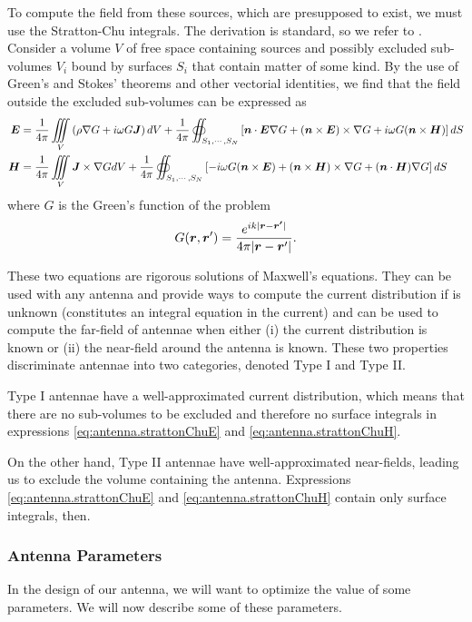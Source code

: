 To compute the field from these sources, which are presupposed to exist, 
we must use the Stratton-Chu integrals. The derivation is standard, so we 
refer to \cite{ELL2003}. Consider a volume $V$ of free space containing
sources and possibly excluded sub-volumes $V_i$ bound by surfaces $S_i$ that contain matter
of some kind. By the use of Green's and Stokes' theorems and other vectorial 
identities, we find that the field outside the excluded sub-volumes
can be expressed as
  \begin{align}
   \boldsymbol{E} &= \frac{1}{4\pi}\mathop{\iiint}_V \left(\rho\nabla G+i\omega G\boldsymbol{J}\right)dV
	+\frac{1}{4\pi}\oiint_{S_1,\cdots,S_N}\left[\boldsymbol{n}\cdot\boldsymbol{E}\nabla G+(\boldsymbol{n}\times\boldsymbol{E})\times\nabla G+i\omega G(\boldsymbol{n}\times\boldsymbol{H})\right]dS\label{eq:antenna.strattonChuE}\\
   \boldsymbol{H} &= \frac{1}{4\pi}\mathop{\iiint}_V \boldsymbol{J}\times\nabla G dV
	+\frac{1}{4\pi}\oiint_{S_1,\cdots,S_N}\left[-i\omega G(\boldsymbol{n}\times\boldsymbol{E})+(\boldsymbol{n}\times\boldsymbol{H})\times\nabla G+(\boldsymbol{n}\cdot\boldsymbol{H})\nabla G\right]dS\label{eq:antenna.strattonChuH}
  \end{align}
where $G$ is the Green's function of the problem
  \begin{equation}
   G(\boldsymbol{r},\boldsymbol{r}') = \frac{e^{ik|\boldsymbol{r}-\boldsymbol{r'}|}}{4\pi|\boldsymbol{r}-\boldsymbol{r}'|}.
  \end{equation}

These two equations are rigorous solutions of Maxwell's equations. 
They can be used with any antenna and provide ways to compute the 
current distribution if is unknown (constitutes an integral equation in the current)
and can be used to compute the far-field of antennae when either 
(i) the current distribution is known or (ii) the near-field around the antenna
is known. 
These two properties discriminate antennae into two categories, denoted Type I and Type II.

Type I antennae have a well-approximated current distribution, which means that there are no
sub-volumes to be excluded and therefore no surface integrals in expressions 
\eqref{eq:antenna.strattonChuE} and \eqref{eq:antenna.strattonChuH}. 

On the other hand, Type II antennae have well-approximated near-fields, leading
us to exclude the volume containing the antenna. Expressions \eqref{eq:antenna.strattonChuE}
and \eqref{eq:antenna.strattonChuH} contain only surface integrals, then. 

\subsubsection{Antenna Parameters}
In the design of our antenna, we will want to optimize the value
of some parameters. We will now describe some of these parameters.

